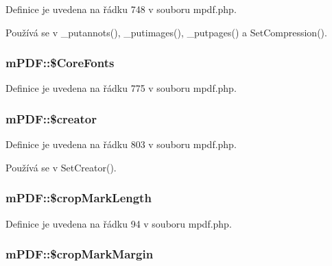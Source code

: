 Definice je uvedena na řádku 748 v souboru mpdf.\-php.



Používá se v \-\_\-putannots(), \-\_\-putimages(), \-\_\-putpages() a Set\-Compression().

\hypertarget{classm_p_d_f_a64b04c801128bf756c230f7d82bca3e7}{
\subsubsection[{\$\-Core\-Fonts}]{\setlength{\rightskip}{0pt plus 5cm}m\-P\-D\-F\-::\$\-Core\-Fonts}}\label{classm_p_d_f_a64b04c801128bf756c230f7d82bca3e7}


Definice je uvedena na řádku 775 v souboru mpdf.\-php.

\hypertarget{classm_p_d_f_a182e5a7fbae258fa800bbf98298b2f8a}{
\subsubsection[{\$creator}]{\setlength{\rightskip}{0pt plus 5cm}m\-P\-D\-F\-::\$creator}}\label{classm_p_d_f_a182e5a7fbae258fa800bbf98298b2f8a}


Definice je uvedena na řádku 803 v souboru mpdf.\-php.



Používá se v Set\-Creator().

\hypertarget{classm_p_d_f_ad8994d84ba6b47a98774e70d0489ab28}{
\subsubsection[{\$crop\-Mark\-Length}]{\setlength{\rightskip}{0pt plus 5cm}m\-P\-D\-F\-::\$crop\-Mark\-Length}}\label{classm_p_d_f_ad8994d84ba6b47a98774e70d0489ab28}


Definice je uvedena na řádku 94 v souboru mpdf.\-php.

\hypertarget{classm_p_d_f_a512a8f96ac434661bd22179ecef1265f}{
\subsubsection[{\$crop\-Mark\-Margin}]{\setlength{\rightskip}{0pt plus 5cm}m\-P\-D\-F\-::\$crop\-Mark\-Margin}}\label{classm_p_d_f_a512a8f96ac434661bd22179ecef1265f}


